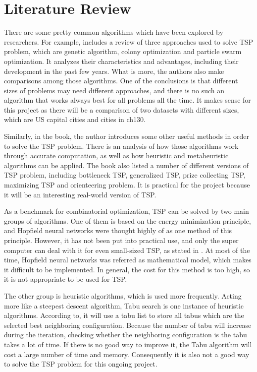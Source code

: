 \documentclass{article}
\begin{document}
\section{Literature Review}
There are some pretty common algorithms which have been explored by researchers. For example, \citep{Vikas2017Raman}includes a review of three approaches used to solve TSP problem, which are genetic algorithm, colony optimization and particle swarm optimization. It analyzes their characteristics and advantages, including their development in the past few years. What is more, the authors also make comparisons among those algorithms. One of the conclusions is that different sizes of problems may need different approaches, and there is no such an algorithm that works always best for all problems all the time. It makes sense for this project as there will be a comparison of two datasets with different sizes, which are US capital cities and cities in ch130.

Similarly, in the book\citep{GutinGregory2007TTSP}, the author introduces some other useful methods in order to solve the TSP problem. There is an analysis of how those algorithms work through accurate computation, as well as how heuristic and metaheuristic algorithms can be applied. The book also listed a number of different versions of TSP problem, including bottleneck TSP, generalized TSP, prize collecting TSP, maximizing TSP and orienteering problem. It is practical for the project because it will be an interesting real-world version of TSP.

As a benchmark for combinatorial optimization, TSP can be solved by two main groups of algorithms. One of them is based on the energy minimization principle, and Hopfield neural networks were thought highly of as one method of this principle. However, it has not been put into practical use, and only the super computer can deal with it for even small-sized TSP, as stated in\citep{7175910} . At most of the time, Hopfield neural networks was referred as mathematical model, which makes it difficult to be implemented. In general, the cost for this method is too high, so it is not appropriate to be used for TSP.

The other group is heuristic algorithms, which is used more frequently. Acting more like a steepest descent algorithm, Tabu search is one instance of heuristic algorithms. According to\citep{SchneiderJohannesJosef2006TSAt}, it will use a tabu list to store all tabus which are the selected best neighboring configuration. Because the number of tabu will increase during the iteration, checking whether the neighboring configuration is the tabu takes a lot of time. If there is no good way to improve it, the Tabu algorithm will cost a large number of time and memory. Consequently it is also not a good way to solve the TSP problem for this ongoing project.
\end{document}
